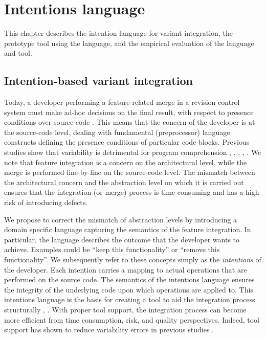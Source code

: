 \chapter{Intentions language}
This chapter describes the intention language for variant integration, the prototype tool using the language, and the empirical evaluation of the language and tool.

\section{Intention-based variant integration}
Today, a developer performing a feature-related merge in a revision control system must make ad-hoc decisions on the final result, with respect to presence conditions over source code \cite{stanciulescu2016concepts}. This means that the concern of the developer is at the source-code level, dealing with fundamental (preprocessor) language constructs defining the presence conditions of particular code blocks. Previous studies show that variability is detrimental for program comprehension \cite{melo2016latin}, \cite{favre1997understanding}, \cite{ernst2002preprocessor}, \cite{abal2014variability}, \cite{medeiros2015preprocessor} . We note that feature integration is a concern on the architectural level, while the merge is performed line-by-line on the source-code level. The mismatch between the architectural concern and the abstraction level on which it is carried out ensures that the integration (or merge) process is time consuming and has a high risk of introducing defects.

We propose to correct the mismatch of abstraction levels by introducing a domain specific language capturing the semantics of the feature integration. In particular, the language describes the outcome that the developer wants to achieve. Examples could be ``keep this functionality'' or ``remove this functionality''. We subsequently refer to these concepts simply as the \textit{intentions} of the developer. Each intention carries a mapping to actual operations that are performed on the source code. The semantics of the intentions language ensures the integrity of the underlying code upon which operations are applied to. This intentions language is the basis for creating a tool to aid the integration process structurally \cite{mens2002}, \cite{apel2011}. With proper tool support, the integration process can become more efficient from time consumption, risk, and quality perspectives. Indeed, tool support has shown to reduce variability errors in previous studies \cite{ribeiro2014emergent}.

